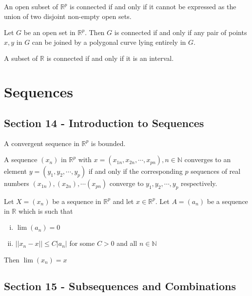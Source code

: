\documentclass[12pt]{article}
\newcommand{\N}{\mathbb{N}}
\newcommand{\R}{\mathbb{R}}
\newenvironment{theorem}[2][Theorem]{\begin{trivlist}
\item[\hskip \labelsep {\bfseries #1}\hskip \labelsep {\bfseries #2.}]}{\end{trivlist}}
\newenvironment{lemma}[2][Lemma]{\begin{trivlist}
\item[\hskip \labelsep {\bfseries #1}\hskip \labelsep {\bfseries #2.}]}{\end{trivlist}}
\begin{document}
\begin{lemma}{12.6}
An open subset of $\mathbb{R}^p$ is connected if and only if it cannot be expressed as the union of two disjoint non-empty open sets.
\end{lemma}

\begin{theorem}{12.7}
Let $G$ be an open set in $\R^p$. Then $G$ is connected if and only if any pair of points $x, y$ in $G$ can be joined by a polygonal curve lying entirely in $G$.
\end{theorem}

\begin{theorem}{12.8}
A subset of $\R$ is connected if and only if it is an interval.
\end{theorem}
\newpage
\section{Sequences}

\subsection*{Section 14 - Introduction to Sequences}

\begin{lemma}{14.6}
A convergent sequence in $\R^p$ is bounded.
\end{lemma}

\begin{theorem}{14.7}
A sequence $(x_n)$ in $\R^p$ with $x = (x_{1n}, x_{2n}, \cdots, x_{pn}), n \in \N$ converges to an element $y = (y_1, y_2, \cdots, y_p)$ if and only if the corresponding $p$ sequences of real numbers $(x_{1n}), (x_{2n}), \cdots (x_{pn})$ converge to $y_1, y_2, \cdots, y_p$ respectively.
\end{theorem}

\begin{theorem}{14.9}
Let $X = (x_n)$ be a sequence in $\R^p$ and let $x \in \R^p$. Let $A = (a_n)$ be a sequence in $\R$ which is such that 
\begin{enumerate}[i)]
\item $\lim (a_n) = 0$
\item $||x_n - x|| \leq C |a_n|$ for some $C > 0$ and all $n \in \N$
\end{enumerate}

Then $\lim (x_n) = x$
\end{theorem}

\subsection*{Section 15 - Subsequences and Combinations}
\end{document}
